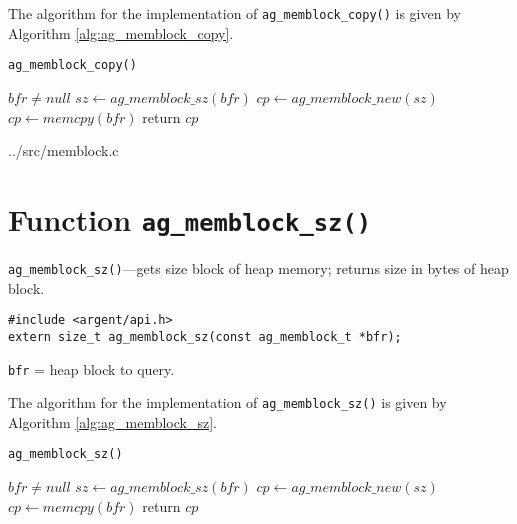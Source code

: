 The algorithm for the implementation of \verb|ag_memblock_copy()| is given by
Algorithm \ref{alg:ag_memblock_copy}.

\begin{algorithm}
\scriptsize
\caption{\texttt{ag\_memblock\_copy()}}
\label{alg:ag_memblock_copy}
\begin{algorithmic}
\Require $bfr \neq null$
\State $sz \gets ag\_memblock\_sz(bfr)$ 
\State $cp \gets ag\_memblock\_new(sz)$ 
\State $cp \gets memcpy(bfr)$ 
\State return $cp$
\EndProcedure
\end{algorithmic}
\end{algorithm}

\lstset{style=CODE}

  {../src/memblock.c}


%


\section{Function \texttt{ag\_memblock\_sz()}}

\begin{noteblock}
\small
\verb|ag_memblock_sz()|---gets size block of heap memory; returns size in bytes
of heap block.
\lstset{style=SYNOPSIS}
\begin{lstlisting}[linewidth=1.0\linewidth]
#include <argent/api.h>
extern size_t ag_memblock_sz(const ag_memblock_t *bfr);
\end{lstlisting}
\verb|bfr| = heap block to query.
\end{noteblock}

The algorithm for the implementation of \verb|ag_memblock_sz()| is given by
Algorithm \ref{alg:ag_memblock_sz}.

\begin{algorithm}
\scriptsize
\caption{\texttt{ag\_memblock\_sz()}}
\label{alg:ag_memblock_sz}
\begin{algorithmic}
\Require $bfr \neq null$
\State $sz \gets ag\_memblock\_sz(bfr)$ 
\State $cp \gets ag\_memblock\_new(sz)$ 
\State $cp \gets memcpy(bfr)$ 
\State return $cp$
\EndProcedure
\end{algorithmic}
\end{algorithm}


